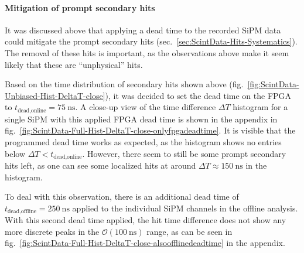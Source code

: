 \paragraph{Mitigation of prompt secondary hits}
It was discussed above that applying a dead time to the recorded \ac{SiPM} data could mitigate the prompt secondary hits (sec.\ \ref{sec:ScintData-Hits-Systematics}). The removal of these hits is important, as the observations above make it seem likely that these are \enquote{unphysical} hits. 
\par Based on the time distribution of secondary hits shown above (fig.\ \ref{fig:ScintData-Unbiased-Hist-DeltaT-close}), it was decided to set the dead time on the \ac{FPGA} to $t_\text{dead,online}=\SI{75}{\nano\second}$. A close-up view of the time difference $\Delta T$ histogram for a single \ac{SiPM} with this applied \ac{FPGA} dead time is shown in the appendix in fig.\ \ref{fig:ScintData-Full-Hist-DeltaT-close-onlyfpgadeadtime}. It is visible that the programmed dead time works as expected, as the histogram shows no entries below $\Delta T < t_\text{dead,online}$. However, there seem to still be some prompt secondary hits left, as one can see some localized hits at around $\Delta T \approx \SI{150}{\nano\second}$ in the histogram.
\par To deal with this observation, there is an additional dead time of $t_\text{dead,offline}=\SI{250}{\nano\second}$ applied to the individual \ac{SiPM} channels in the offline analysis. With this second dead time applied, the hit time difference does not show any more discrete peaks in the $\mathcal{O}(\SI{100}{\nano\second})$ range, as can be seen in fig.\ \ref{fig:ScintData-Full-Hist-DeltaT-close-alsoofflinedeadtime} in the appendix.
